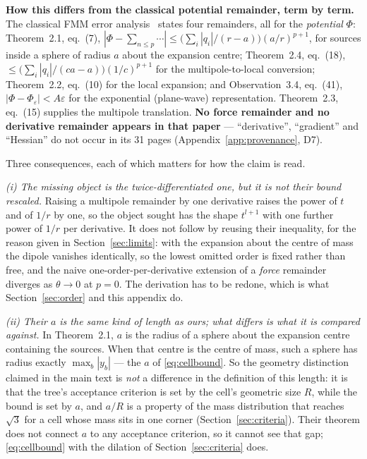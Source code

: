 \noindent\textbf{How this differs from the classical potential remainder, term by term.} The classical
FMM error analysis~\citep{cheng1999fast} states four remainders, all for the \emph{potential} $\Phi$:
Theorem~2.1, eq.~(7),
$|\Phi-\sum_{n\le p}\cdots|\le\bigl(\sum_i|q_i|/(r-a)\bigr)(a/r)^{p+1}$, for sources inside a sphere
of radius $a$ about the expansion centre; Theorem~2.4, eq.~(18),
$\le\bigl(\sum_i|q_i|/(ca-a)\bigr)(1/c)^{p+1}$ for the multipole-to-local conversion; Theorem~2.2,
eq.~(10) for the local expansion; and Observation~3.4, eq.~(41), $|\Phi-\Phi_\varepsilon|<A\varepsilon$
for the exponential (plane-wave) representation. Theorem~2.3, eq.~(15) supplies the multipole
translation. \textbf{No force remainder and no derivative remainder appears in that paper} ---
``derivative'', ``gradient'' and ``Hessian'' do not occur in its 31 pages
(Appendix~\ref{app:provenance}, D7).

Three consequences, each of which matters for how the claim is read.

\emph{(i) The missing object is the twice-differentiated one, but it is not their bound rescaled.}
Raising a multipole remainder by one derivative raises the power of $t$ and of $1/r$ by one, so the
object sought has the shape $t^{l+1}$ with one further power of $1/r$ per derivative. It does not
follow by reusing their inequality, for the reason given in Section~\ref{sec:limits}: with the
expansion about the centre of mass the dipole vanishes identically, so the lowest omitted order is
fixed rather than free, and the naive one-order-per-derivative extension of a \emph{force} remainder
diverges as $\theta\to0$ at $p{=}0$. The derivation has to be redone, which is what
Section~\ref{sec:order} and this appendix do.

\emph{(ii) Their $a$ is the same kind of length as ours; what differs is what it is compared
against.} In Theorem~2.1, $a$ is the radius of a sphere about the expansion centre containing the
sources. When that centre is the centre of mass, such a sphere has radius exactly $\max_b|y_b|$ ---
the $a$ of \eqref{eq:cellbound}. So the geometry distinction claimed in the main text is \emph{not} a
difference in the definition of this length: it is that the tree's acceptance criterion is set by the
cell's geometric size $R$, while the bound is set by $a$, and $a/R$ is a property of the mass
distribution that reaches $\sqrt3$ for a cell whose mass sits in one corner
(Section~\ref{sec:criteria}). Their theorem does not connect $a$ to any acceptance criterion, so it
cannot see that gap; \eqref{eq:cellbound} with the dilation of Section~\ref{sec:criteria} does.

